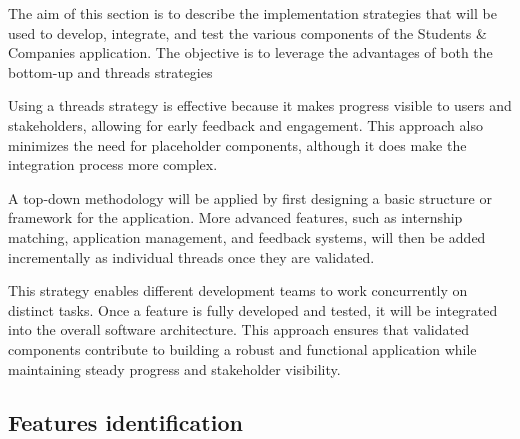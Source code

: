 The aim of this section is to describe the implementation strategies that will be used to develop, integrate, and test the various components of the Students \& Companies application. The objective is to leverage the advantages of both the bottom-up and threads strategies

Using a threads strategy is effective because it makes progress visible to users and stakeholders, allowing for early feedback and engagement. This approach also minimizes the need for placeholder components, although it does make the integration process more complex.

A top-down methodology will be applied by first designing a basic structure or framework for the application. More advanced features, such as internship matching, application management, and feedback systems, will then be added incrementally as individual threads once they are validated.

This strategy enables different development teams to work concurrently on distinct tasks. Once a feature is fully developed and tested, it will be integrated into the overall software architecture. This approach ensures that validated components contribute to building a robust and functional application while maintaining steady progress and stakeholder visibility.

\subsection{Features identification}